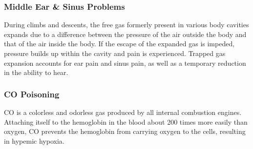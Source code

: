 \documentclass[12pt]{article}
\begin{document}
		\subsubsection{Middle Ear \& Sinus Problems}
			During climbs and descents, the free gas formerly present in various body cavities expands due to a difference between the pressure of the air outside the body and that of the air inside the body. If the escape of the expanded gas is impeded, pressure builds up within the cavity and pain is experienced. Trapped gas expansion accounts for ear pain and sinus pain, as well as a temporary reduction in the ability to hear.
		\subsubsection{CO Poisoning}
			CO is a colorless and odorless gas produced by all internal combustion engines. Attaching itself to the hemoglobin in the blood about 200 times more easily than oxygen, CO prevents the hemoglobin from carrying oxygen to the cells, resulting in hypemic hypoxia.
\end{document}
